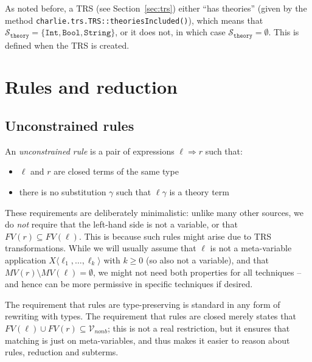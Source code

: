 \documentclass{lmcs}
\theoremstyle{theorem}\newtheorem{theorem}{Theorem}
\theoremstyle{theorem}\newtheorem{lemma}[theorem]{Lemma}
\theoremstyle{theorem}\newtheorem{corollary}[theorem]{Corollary}
\theoremstyle{definition}\newtheorem{definition}[theorem]{Definition}
\theoremstyle{definition}\newtheorem{example}[theorem]{Example}
\newcommand{\Vfree}{\mathcal{V}_{\mathit{nonb}}}
\newcommand{\thSorts}{\mathcal{S}_{\mathtt{theory}}}
\newcommand{\FV}{\mathit{FV}}
\newcommand{\FMV}{\mathit{MV}}
\newcommand{\Avar}{X}
\newcommand{\meta}[2]{#1\langle#2\rangle}
\newcommand{\arrz}{\Rightarrow}
\newcommand{\symb}[1]{\mathtt{#1}}
\newcommand{\bool}{\symb{Bool}}
\newcommand{\tint}{\symb{Int}}
\newcommand{\tstring}{\symb{String}}
\begin{document}
As noted before, a TRS (see Section~\ref{sec:trs}) either ``has theories''
(given by the method \texttt{charlie.trs.TRS::theoriesIncluded()}), which
means that $\thSorts = \{\tint,\bool,\tstring\}$, or it does not, in which case
$\thSorts = \emptyset$.  This is defined when the TRS is created.

\section{Rules and reduction}

\subsection{Unconstrained rules}

An \emph{unconstrained rule} is a pair of expressions $\ell \arrz r$ such that:
\begin{itemize}
\item $\ell$ and $r$ are closed terms of the same type
\item there is no substitution $\gamma$ such that $\ell\gamma$ is a theory term
\end{itemize}

These requirements are deliberately minimalistic: unlike many other sources, we
do \emph{not} require that the left-hand side is not a variable, or that $\FV(r)
\subseteq \FV(\ell)$.  This is because such rules might arise due to TRS
transformations.  While we will usually assume that $\ell$ is not a
meta-variable application $\meta{\Avar}{\ell_1,\dots,\ell_k}$ with $k \geq 0$
(so also not a variable), and that $\FMV(r) \setminus \FMV(\ell) = \emptyset$,
we might not need both properties for all techniques -- and hence can be more
permissive in specific techniques if desired.

The requirement that rules are type-preserving is standard in any form of
rewriting with types.  The requirement that rules are closed merely states that
$\FV(\ell) \cup \FV(r) \subseteq \Vfree$; this is not a real restriction, but it
ensures that matching is just on meta-variables, and thus makes it easier to
reason about rules, reduction and subterms.
\end{document}
